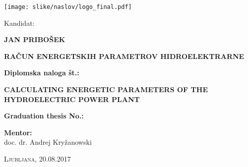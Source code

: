 \thispagestyle{empty}

\begin{minipage}{\textwidth}

\begin{center}

\vspace*{-3cm}


\begin{center}
\advance\leftskip-2cm
\texttt{[image: slike/naslov/logo\_final.pdf]}
\end{center}




Kandidat:\\
\vspace*{0.5cm}
\begin{Large}
\textbf{JAN PRIBOŠEK}
\end{Large}

\vspace*{2cm}

\begin{Large}
\textbf{RAČUN ENERGETSKIH PARAMETROV HIDROELEKTRARNE}
\end{Large}

\vspace*{0.5cm}

\begin{large}
\textbf{Diplomska naloga št.:}
\end{large}

\vspace*{1.5cm}

\begin{Large}
	\textbf{CALCULATING ENERGETIC PARAMETERS OF THE HYDROELECTRIC POWER PLANT}
\end{Large}

\vspace*{0.5cm}

\begin{large}
	\textbf{Graduation thesis No.:}
\end{large}



\end{center}
\vspace*{8cm}


\begin{large}
	\textbf{Mentor:}\\
	doc. dr. Andrej Kryžanowski \\
\end{large}

\begin{center}
\textsc{Ljubljana, 20.08.2017}
\end{center}

\end{minipage}

\newpage
\thispagestyle{empty}
\cleardoublepage